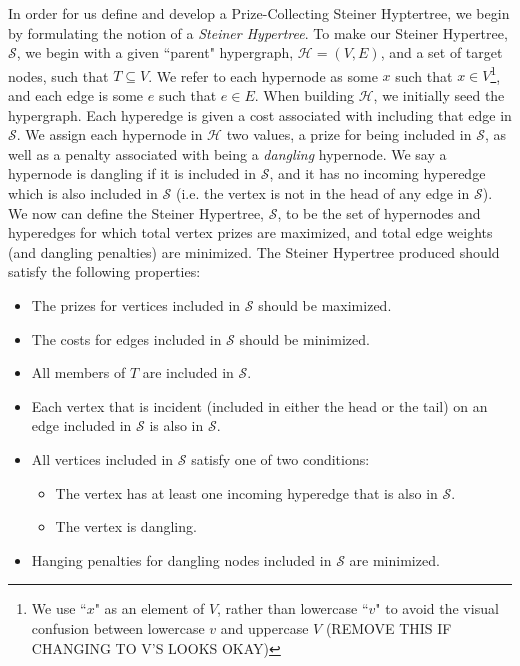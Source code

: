 \documentclass[12pt,twoside]{reedthesis}
\begin{document}
In order for us define and develop a Prize-Collecting Steiner Hyptertree, we begin by formulating the notion of a \textit{Steiner Hypertree}.  To make our Steiner Hypertree, $\mathcal{S}$, we begin with a given ``parent" hypergraph, $\mathcal{H} = (V,E)$, and a set of target nodes, such that $T \subseteq V$.  We refer to each hypernode as some $x$ such that $x \in V$\footnote{We use ``$x$" as an element of $V$, rather than lowercase ``$v$" to avoid the visual confusion between lowercase $v$ and uppercase $V$ (REMOVE THIS IF CHANGING TO V'S LOOKS OKAY)}, and each edge is some $e$ such that $e \in E$.  When building $\mathcal{H}$, we initially seed the hypergraph.  Each hyperedge is given a cost associated with including that edge in $\mathcal{S}$.  We assign each hypernode in $\mathcal{H}$ two values, a prize for being included in $\mathcal{S}$, as well as a penalty associated with being a \textit{dangling} hypernode.  We say a hypernode is dangling if it is included in $\mathcal{S}$, and it has no incoming hyperedge which is also included in $\mathcal{S}$ (i.e. the vertex is not in the head of any edge in $\mathcal{S}$).\\

We now can define the Steiner Hypertree, $\mathcal{S}$, to be the set of hypernodes and hyperedges for which total vertex prizes are maximized, and total edge weights (and dangling penalties) are minimized.  The Steiner Hypertree produced should satisfy the following properties:

\begin{itemize}
	\item The prizes for vertices included in $\mathcal{S}$ should be maximized.
	\item The costs for edges included in $\mathcal{S}$ should be minimized.
	\item All members of $T$ are included in $\mathcal{S}$.
	\item Each vertex that is incident (included in either the head or the tail) on an edge included in $\mathcal{S}$ is also in $\mathcal{S}$. 
	\item All vertices included in $\mathcal{S}$ satisfy one of two conditions:
	\begin{itemize}
		\item The vertex has at least one incoming hyperedge that is also in $\mathcal{S}$.
		\item The vertex is dangling.
	\end{itemize}
	\item Hanging penalties for dangling nodes included in $\mathcal{S}$ are minimized.
\end{itemize}
\end{document}
